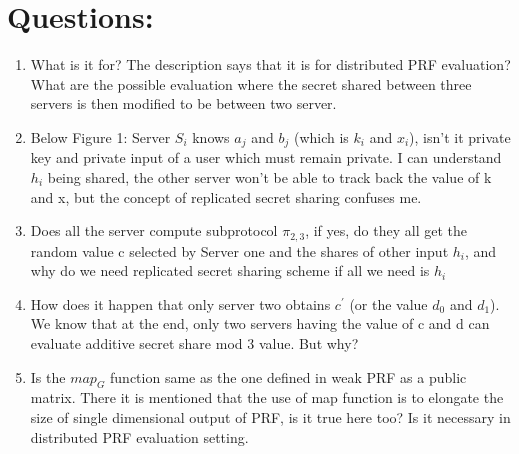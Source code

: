\documentclass[11pt]{article}
\begin{document}
\section{Questions:}

\begin{enumerate}
	\item What is it for? The description says that it is for distributed PRF evaluation? What are the possible evaluation where the secret shared between three servers is then modified to be between two server.
	\item Below Figure 1: Server $S_{i}$ knows $a_{j}$ and $b_{j}$ (which is $k_{i}$ and $x_{i}$), isn't it private key and private input of a user which must remain private. I can understand $h_{i}$ being shared, the other server won't be able to track back the value of k and x, but the concept of replicated secret sharing confuses me.
	\item Does all the server compute subprotocol $\pi_{2,3}$, if yes, do they all get the random value c selected by Server one and the shares of other input $h_{i}$, and why do we need replicated secret sharing scheme if all we need is $h_{i}$
	\item How does it happen that only server two obtains $c^{'}$ (or the value $d_{0}$ and $d_{1}$). We know that at the end, only two servers having the value of c and d can evaluate additive secret share mod 3 value. But why?
	\item Is the $map_{G}$ function same as the one defined in weak PRF as a public matrix. There it is mentioned that the use of map function is to elongate the size of single dimensional output of PRF, is it true here too? Is it necessary in distributed PRF evaluation setting.
\end{enumerate}
\end{document}
